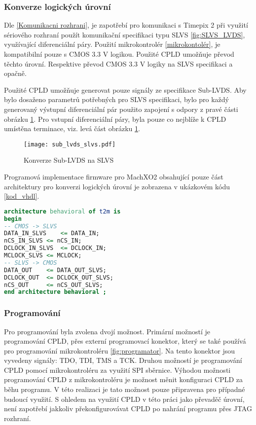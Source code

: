 	\subsubsection{Konverze logických úrovní}
	\label{CPLD konverze}
	Dle \ref{Komunikacni rozhrani}, je zapotřebí pro komunikaci s Timepix 2 při využití sériového rozhraní použít komunikační specifikaci typu SLVS \ref{fig:SLVS_LVDS}, využívající diferenciální páry. Použití mikrokontrolér \ref{mikrokontolér}, je kompatibilní pouze s CMOS 3.3 V logikou. Použité CPLD umožňuje převod těchto úrovní. Respektive převod CMOS 3.3 V logiky na SLVS specifikaci a opačně.
	\par Použité CPLD umožňuje generovat pouze signály ze specifikace Sub-LVDS. Aby bylo dosaženo parametrů potřebných pro SLVS specifikaci, bylo pro každý generovaný výstupní diferenciální pár použito zapojení s odpory z pravé části obrázku \ref{fig:sub_lvds_slvs}. Pro vstupní diferenciální páry, byla pouze co nejblíže k CPLD umístěna terminace, viz. levá část obrázku \ref{fig:sub_lvds_slvs}.
	\begin{figure}[h!]
		\centering
		\captionsetup{justification=centering}
		\texttt{[image: sub\_lvds\_slvs.pdf]}
		\caption{Konverze Sub-LVDS na SLVS} 
		\label{fig:sub_lvds_slvs}
	\end{figure}
	Programová implementace firmware pro MachXO2 obsahující pouze část architektury pro konverzi logických úrovní je zobrazena v ukázkovém kódu \ref{kod_vhdl}.
\begin{lstlisting}[frame=single, language=VHDL, caption={Ukázkový kód ve VHDL pro CPLD}, label=kod_vhdl]
architecture behavioral of t2m is
begin
-- CMOS -> SLVS
DATA_IN_SLVS	<= DATA_IN;
nCS_IN_SLVS	<= nCS_IN;
DCLOCK_IN_SLVS	<= DCLOCK_IN;
MCLOCK_SLVS	<= MCLOCK;
-- SLVS -> CMOS
DATA_OUT	<= DATA_OUT_SLVS;
DCLOCK_OUT	<= DCLOCK_OUT_SLVS;
nCS_OUT		<= nCS_OUT_SLVS;
end architecture behavioral ;
\end{lstlisting}
	\subsubsection{Programování}
	Pro programování byla zvolena dvojí možnost. Primární možností je programování CPLD, přes externí programovací konektor, který se také používá pro programování mikrokontroléru \ref{fig:programator}. Na tento konektor jsou vyvedeny signály: TDO, TDI, TMS a TCK. Druhou možností je programování CPLD pomocí mikrokontroléru za využití SPI sběrnice. Výhodou možnosti programování CPLD z mikrokontroléru je možnost měnit konfiguraci CPLD za běhu programu. V této realizaci je tato možnost pouze připravena pro  případné budoucí využití. S ohledem na využití CPLD v této práci jako převaděč úrovní, není zapotřebí jakkoliv překonfigurovávat CPLD po nahrání programu přes JTAG rozhraní.
